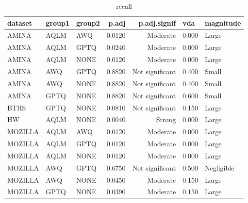 \begin{table}
\caption{recall}
\begin{tabular}{lllrrll}
\toprule
dataset & group1 & group2 & p.adj & p.adj.signif & vda & magnitude \\
\midrule
AMINA & AQLM & AWQ & 0.0120 & Moderate & 0.000 & Large \\
AMINA & AQLM & GPTQ & 0.0240 & Moderate & 0.000 & Large \\
AMINA & AQLM & NONE & 0.0120 & Moderate & 0.000 & Large \\
AMINA & AWQ & GPTQ & 0.8820 & Not significant & 0.400 & Small \\
AMINA & AWQ & NONE & 0.8820 & Not significant & 0.400 & Small \\
AMINA & GPTQ & NONE & 0.8820 & Not significant & 0.600 & Small \\
BTHS & GPTQ & NONE & 0.0810 & Not significant & 0.150 & Large \\
HW & AQLM & NONE & 0.0040 & Strong & 0.000 & Large \\
MOZILLA & AQLM & AWQ & 0.0120 & Moderate & 0.000 & Large \\
MOZILLA & AQLM & GPTQ & 0.0120 & Moderate & 0.000 & Large \\
MOZILLA & AQLM & NONE & 0.0120 & Moderate & 0.000 & Large \\
MOZILLA & AWQ & GPTQ & 0.6750 & Not significant & 0.500 & Negligible \\
MOZILLA & AWQ & NONE & 0.0450 & Moderate & 0.150 & Large \\
MOZILLA & GPTQ & NONE & 0.0390 & Moderate & 0.150 & Large \\
\bottomrule
\end{tabular}
\end{table}
